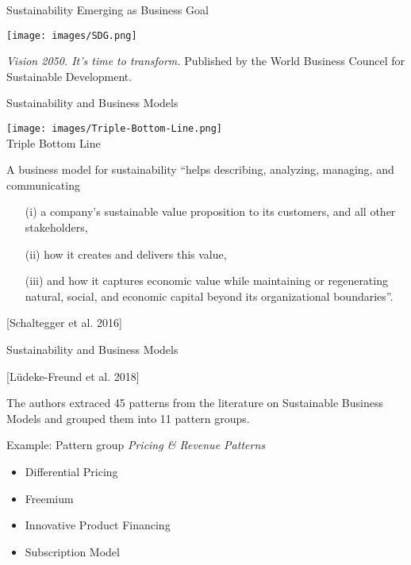 \documentclass{beamer}
\begin{document}
\begin{frame}{Sustainability Emerging as Business Goal}

\begin{center}
  \texttt{[image: images/SDG.png]}
\end{center}\vspace*{-4em}

\emph{Vision 2050. It's time to transform.} Published by the World Business
Councel for Sustainable Development.

\end{frame}

\begin{frame}{Sustainability and Business Models}
\begin{center}
  \begin{minipage}{.4\textwidth}\centering
    \texttt{[image: images/Triple-Bottom-Line.png]}\\
    Triple Bottom Line
  \end{minipage}
  \begin{minipage}{.55\textwidth}
    A business model for sustainability “helps describing, analyzing,
    managing, and communicating
  \begin{itemize}
  \item[(i)] a company’s sustainable value proposition to its customers, and
    all other stakeholders,
  \item[(ii)] how it creates and delivers this value,
  \item[(iii)] and how it captures economic value while maintaining or
    regenerating natural, social, and economic capital beyond its
    organizational boundaries”.
  \end{itemize}
  [Schaltegger et al. 2016]
  \end{minipage}
\end{center}
\end{frame}

\begin{frame}{Sustainability and Business Models}

  [Lüdeke-Freund et al. 2018]
  
The authors extraced 45 patterns from the literature on Sustainable Business
Models and grouped them into 11 pattern groups.

Example: Pattern group \emph{Pricing \& Revenue Patterns}
\begin{itemize}
\item Differential Pricing
\item Freemium
\item Innovative Product Financing
\item Subscription Model
\end{itemize}
\end{frame}
\end{document}
